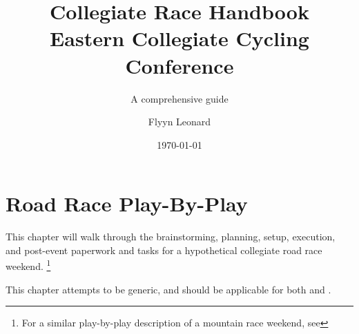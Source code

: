 \documentclass[
  letterpaper, %
  fontsize=10pt, %
  twoside=true,
  chapterentrydots=true, %
  numbers=noenddot,
  fontmethod=tex,
]{kaobook}
\begin{document}

\title[ECCC Race Handbook]{
  Collegiate Race Handbook \\
  Eastern Collegiate Cycling Conference
}
\subtitle{A comprehensive guide}

\author{Flyyn Leonard}
\date{\today}

\publishers{Northeast Collegiate Cycling Corporation}


\frontmatter


\maketitle



\begingroup
\setlength{\textheight}{230\hscale} %

\etocstandarddisplaystyle
\etocstandardlines

\tableofcontents




\endgroup

\mainmatter
{}


\setchapterpreamble[u]{\margintoc}
\chapter{Road Race Play-By-Play}

This chapter will walk through the brainstorming,
planning, setup, execution, and post-event paperwork and tasks for a hypothetical collegiate road race weekend.%
\footnote{For a similar play-by-play description of a mountain race weekend,
see }

This chapter attempts to be generic, and should be applicable for both
 and
.
\end{document}

